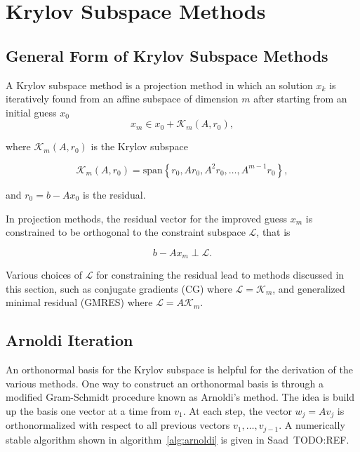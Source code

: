 \chapter{Krylov Subspace Methods}
\label{chapter:KrylovSolvers}
\section{General Form of Krylov Subspace Methods}
A Krylov subspace method is a projection method in which an solution $x_k$ is iteratively found from an affine subspace of dimension $m$ after starting from an initial guess $x_0$
\begin{equation}
    x_m \in x_0 + \mathcal{K}_m(A, r_0),
\end{equation}

where $\mathcal{K}_m(A, r_0)$ is the Krylov subspace

\begin{equation}
    \mathcal{K}_m(A, r_0) = \text{span}\left\{r_0, Ar_0, A^2r_0, \ldots, A^{m-1}r_0 \right\},
\end{equation}

and $r_0 = b - Ax_0$ is the residual.

In projection methods, the residual vector for the improved guess $x_m$ is constrained to be orthogonal to the constraint subspace $\mathcal{L}$, that is

\begin{equation}
    \label{eq:constraint_space}
    b - Ax_m \perp \mathcal{L}.
\end{equation}

Various choices of $\mathcal{L}$ for constraining the residual lead to methods discussed in this section, such as conjugate gradients (CG) where $\mathcal{L} = \mathcal{K}_m$, and generalized minimal residual (GMRES) where $\mathcal{L} = A\mathcal{K}_m$.

\section{Arnoldi Iteration}
An orthonormal basis for the Krylov subspace is helpful for the derivation of the various methods. One way to construct an orthonormal basis is through a modified Gram-Schmidt procedure known as Arnoldi's method. The idea is build up the basis one vector at a time from $v_1$. At each step, the vector $w_j = Av_j$ is orthonormalized with respect to all previous vectors $v_1, \ldots, v_{j-1}$. A numerically stable algorithm shown in algorithm~\ref{alg:arnoldi} is given in Saad~TODO:REF.


